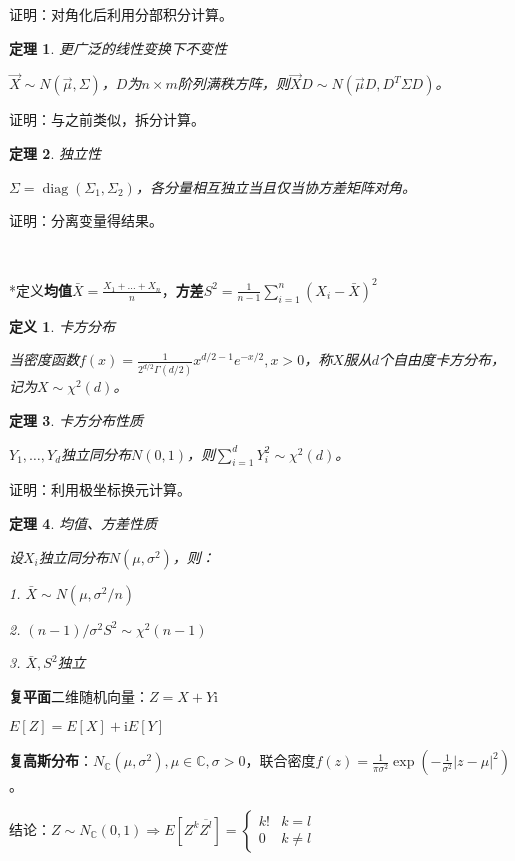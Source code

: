 \documentclass[a4paper,UTF8,fontset=windows]{ctexart}
\newtheorem{thm}{定理}[section]
\newtheorem{defi}{定义}[section]
\DeclareMathOperator{\diag}{diag}
\begin{document}
证明：对角化后利用分部积分计算。

\begin{thm} 更广泛的线性变换下不变性
	
$\vec{X}\sim N(\vec{\mu},\Sigma)$，$D$为$n\times m$阶列满秩方阵，则$\vec{X}D\sim N(\vec{\mu}D,D^T\Sigma D)$。
\end{thm}

证明：与之前类似，拆分计算。

\begin{thm} 独立性

$\Sigma=\diag(\Sigma_1,\Sigma_2)$，各分量相互独立当且仅当协方差矩阵对角。
\end{thm}

证明：分离变量得结果。

~

*定义\textbf{均值}$\bar{X}=\frac{X_1+\dots+X_n}{n}$，\textbf{方差}$S^2=\frac{1}{n-1}\sum_{i=1}^n(X_i-\bar{X})^2$

\begin{defi} 卡方分布
	
当密度函数$f(x)=\frac{1}{2^{d/2}\Gamma(d/2)}x^{d/2-1}e^{-x/2},x>0$，称$X$服从$d$个自由度卡方分布，记为$X\sim\chi^2(d)$。
\end{defi}

\begin{thm} 卡方分布性质

$Y_1,\dots,Y_d$独立同分布$N(0,1)$，则$\sum_{i=1}^dY_i^2\sim\chi^2(d)$。
\end{thm}

证明：利用极坐标换元计算。

\begin{thm} 均值、方差性质

设$X_i$独立同分布$N(\mu,\sigma^2)$，则：

1. $\bar{X}\sim N(\mu,\sigma^2/n)$

2. $(n-1)/\sigma^2S^2\sim\chi^2(n-1)$

3. $\bar{X},S^2$独立
\end{thm}

\textbf{复平面}二维随机向量：$Z=X+Y\mathrm{i}$

$E[Z]=E[X]+\mathrm{i}E[Y]$

\textbf{复高斯分布}：$N_\mathbb{C}(\mu,\sigma^2),\mu\in\mathbb{C},\sigma>0$，联合密度$f(z)=\frac{1}{\pi\sigma^2}\exp\left(-\frac{1}{\sigma^2}|z-\mu|^2\right)$。

结论：$Z\sim N_\mathbb{C}(0,1)\Rightarrow E[Z^k\overline{Z^l}]=\begin{cases}k!&k=l\\0&k\neq l\end{cases}$
\end{document}
